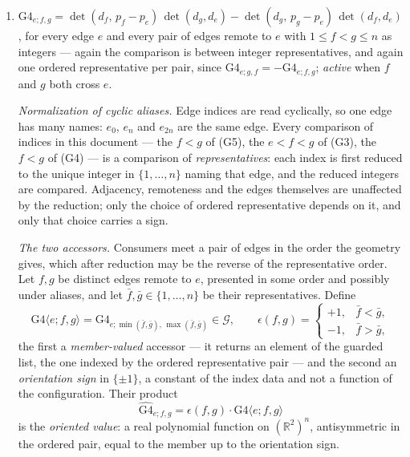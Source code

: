 \begin{definition}
\begin{enumerate}
the plane, or all three are parallel. A parallel \emph{pair} with a transverse
third does \emph{not} make it vanish --- an earlier revision said it did, and the
configuration $p_0=(0,0)$, $p_1=(1,0)$, $p_2=(0,1)$, $p_3=(1,1)$, $p_4=(2,-1)$,
$p_5=(2,2)$ refutes it, the rows of $e_0,e_2,e_4$ being $(0,1,0)$, $(0,1,-1)$
and $(-3,0,6)$ with determinant $3$. On the active domain the three edges
pairwise cross, so no two of the lines are parallel and the vanishing is exactly
a concurrence at a finite point, which is what every consumer reads.
\item[(G4)] $\mathrm{G4}_{e;f,g}
=\det(d_f,\,p_f-p_e)\,\det(d_g,d_e)-\det(d_g,\,p_g-p_e)\,\det(d_f,d_e)$,
for every edge $e$ and every pair of edges remote to $e$ with
$1\leq f<g\leq n$ as integers --- again the comparison is between integer
representatives, and again one ordered representative per pair, since
$\mathrm{G4}_{e;g,f}=-\mathrm{G4}_{e;f,g}$; \emph{active} when $f$ and $g$ both
cross $e$.

\emph{Normalization of cyclic aliases.} Edge indices are read cyclically, so
one edge has many names: $e_0$, $e_n$ and $e_{2n}$ are the same edge. Every
comparison of indices in this document --- the $f<g$ of (G5), the $e<f<g$ of
(G3), the $f<g$ of (G4) --- is a comparison of \emph{representatives}: each
index is first reduced to the unique integer in $\{1,\dots,n\}$ naming that
edge, and the reduced integers are compared. Adjacency, remoteness and the
edges themselves are unaffected by the reduction; only the choice of ordered
representative depends on it, and only that choice carries a sign.

\emph{The two accessors.} Consumers meet a pair of edges in the order the
geometry gives, which after reduction may be the reverse of the representative
order. Let $f,g$ be distinct edges remote to $e$, presented in some order and
possibly under aliases, and let $\bar f,\bar g\in\{1,\dots,n\}$ be their
representatives. Define
\[
   \mathrm{G4}\langle e;f,g\rangle
   =\mathrm{G4}_{e;\min(\bar f,\bar g),\,\max(\bar f,\bar g)}\in\mathcal G,
   \qquad
   \epsilon(f,g)=\begin{cases}+1,&\bar f<\bar g,\\ -1,&\bar f>\bar g,\end{cases}
\]
the first a \emph{member-valued} accessor --- it returns an element of the
guarded list, the one indexed by the ordered representative pair --- and the
second an \emph{orientation sign} in $\{\pm1\}$, a constant of the index data
and not a function of the configuration. Their product
\[
   \widehat{\mathrm{G4}}_{e;f,g}
   =\epsilon(f,g)\cdot\mathrm{G4}\langle e;f,g\rangle
\]
is the \emph{oriented value}: a real polynomial function on $(\mathbb R^2)^n$,
antisymmetric in the ordered pair, equal to the member up to the orientation
sign.


\end{enumerate}
\end{definition}
